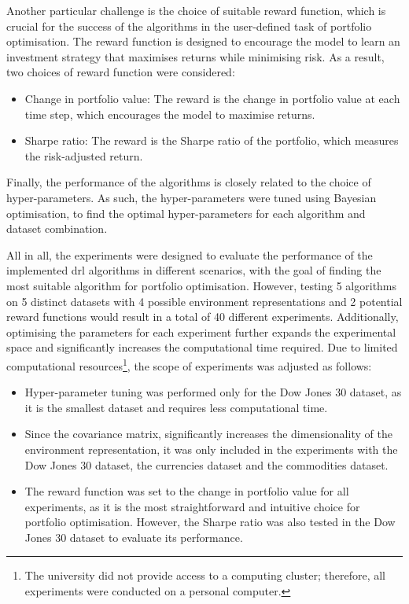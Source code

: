 Another particular challenge is the choice of suitable reward function, which is crucial for the success of the algorithms in the user-defined task of portfolio optimisation. The reward function is designed to encourage the model to learn an investment strategy that maximises returns while minimising risk. As a result, two choices of reward function were considered:
\begin{itemize}
    \item Change in portfolio value: The reward is the change in portfolio value at each time step, which encourages the model to maximise returns.
    \item Sharpe ratio: The reward is the Sharpe ratio of the portfolio, which measures the risk-adjusted return.
\end{itemize}

Finally, the performance of the algorithms is closely related to the choice of hyper-parameters. As such, the hyper-parameters were tuned using Bayesian optimisation, to find the optimal hyper-parameters for each algorithm and dataset combination.

All in all, the experiments were designed to evaluate the performance of the implemented \acrshort{drl} algorithms in different scenarios, with the goal of finding the most suitable algorithm for portfolio optimisation. However, testing 5 algorithms on 5 distinct datasets with 4 possible environment representations and 2 potential reward functions would result in a total of 40 different experiments. Additionally, optimising the parameters for each experiment further expands the experimental space and significantly increases the computational time required. Due to limited computational resources\footnote{The university did not provide access to a computing cluster; therefore, all experiments were conducted on a personal computer.}, the scope of experiments was adjusted as follows:
\begin{itemize}
    \item Hyper-parameter tuning was performed only for the Dow Jones 30 dataset, as it is the smallest dataset and requires less computational time.
    \item Since the covariance matrix, significantly increases the dimensionality of the environment representation, it was only included in the experiments with the Dow Jones 30 dataset, the currencies dataset and the commodities dataset.
    \item The reward function was set to the change in portfolio value for all experiments, as it is the most straightforward and intuitive choice for portfolio optimisation. However, the Sharpe ratio was also tested in the Dow Jones 30 dataset to evaluate its performance.
\end{itemize}

